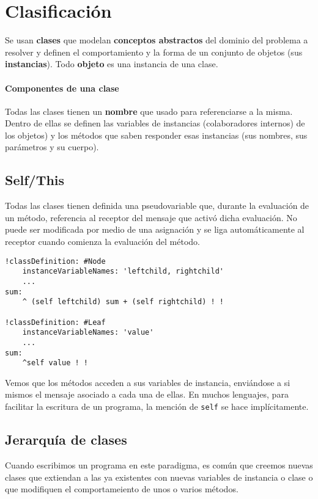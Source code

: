 \section{Clasificación}
Se usan \textbf{clases} que modelan \textbf{conceptos abstractos} del dominio del problema a resolver y definen el comportamiento y la forma de un conjunto de objetos (sus \textbf{instancias}). Todo \textbf{objeto} es una instancia de una clase.

\paragraph{Componentes de una clase}
Todas las clases tienen un \textbf{nombre} que usado para referenciarse a la misma. Dentro de ellas se definen las variables de instancias (colaboradores internos) de los objetos) y los métodos que saben responder esas instancias (sus nombres, sus parámetros y su cuerpo).

\subsection{Self/This}
Todas las clases tienen definida una pseudovariable que, durante la evaluación de un método, referencia al receptor del mensaje que activó dicha evaluación. No puede ser modificada por medio de una asignación y se liga automáticamente al receptor cuando comienza la evaluación del método.

\begin{verbatim}
!classDefinition: #Node 
	instanceVariableNames: 'leftchild, rightchild'
	...
sum: 
	^ (self leftchild) sum + (self rightchild) ! !
	
!classDefinition: #Leaf 
	instanceVariableNames: 'value'
	...
sum: 
	^self value ! !

\end{verbatim}

Vemos que los métodos acceden a sus variables de instancia, enviándose a si mismos el mensaje asociado a cada una de ellas. En muchos lenguajes, para facilitar la escritura de un programa, la mención de \texttt{self} se hace implícitamente.

\subsection{Jerarquía de clases}
Cuando escribimos un programa en este paradigma, es común que creemos nuevas clases que extiendan a las ya existentes con nuevas variables de instancia o clase o que modifiquen el comportameiento de unos o varios métodos.

